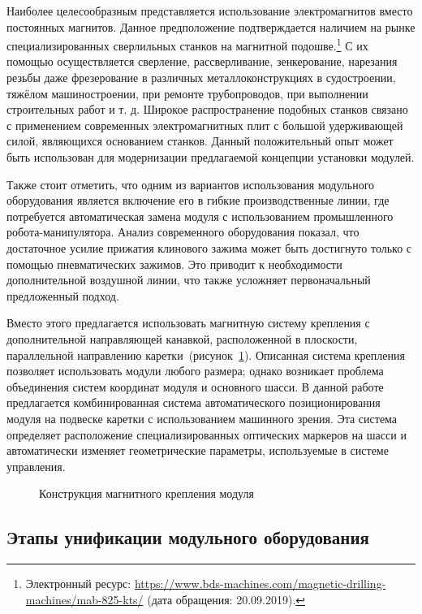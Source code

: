 Наиболее целесообразным представляется использование электромагнитов вместо постоянных магнитов. Данное предположение подтверждается наличием на рынке специализированных сверлильных станков на магнитной подошве.\footnote{Электронный ресурс: {\tiny\url{https://www.bds-machines.com/magnetic-drilling-machines/mab-825-kts/}} (дата обращения: 20.09.2019).} С их помощью осуществляется сверление, рассверливание, зенкерование, нарезания резьбы даже фрезерование в различных металлоконструкциях в судостроении, тяжёлом машиностроении, при ремонте трубопроводов, при выполнении строительных работ и т. д. Широкое распространение подобных станков связано с применением современных электромагнитных плит с большой удерживающей силой, являющихся основанием станков. Данный положительный опыт может быть использован для модернизации предлагаемой концепции установки модулей.

Также стоит отметить, что одним из вариантов использования модульного оборудования является включение его в гибкие производственные линии, где потребуется автоматическая замена модуля с использованием промышленного робота-манипулятора. Анализ современного оборудования показал, что достаточное усилие прижатия клинового зажима может быть достигнуто только с помощью пневматических зажимов. Это приводит к необходимости дополнительной воздушной линии, что также усложняет первоначальный предложенный подход.

Вместо этого предлагается использовать магнитную систему крепления с дополнительной направляющей канавкой, расположенной в плоскости, параллельной направлению каретки~(рисунок~\cref{fig:quick-mount}). Описанная система крепления позволяет использовать модули любого размера; однако возникает проблема объединения систем координат модуля и основного шасси. В данной работе предлагается комбинированная система автоматического позиционирования модуля на подвеске каретки с использованием машинного зрения. Эта система определяет расположение специализированных оптических маркеров на шасси и автоматически изменяет геометрические параметры, используемые в системе управления.

\begin{figure}[ht]
	\caption{Конструкция магнитного крепления модуля}\label{fig:quick-mount}
\end{figure}

\subsection{Этапы унификации модульного оборудования}


